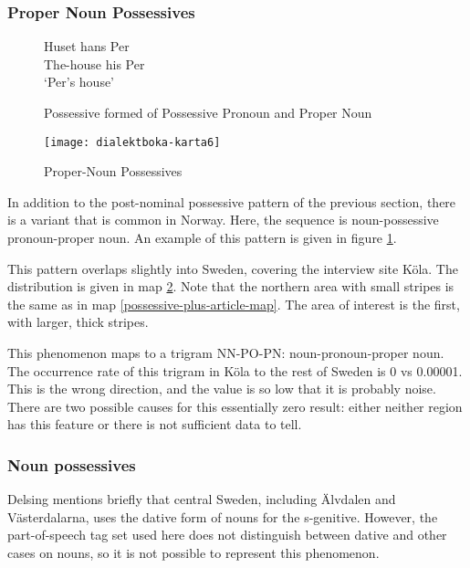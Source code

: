 

\subsubsection{Proper Noun Possessives}

\begin{figure}
 \gll Huset hans Per \\
  The-house his Per \\
  \trans `Per's house'
  \caption{Possessive formed of Possessive Pronoun and Proper Noun}
  \label{proper-noun-post-possessive}
\end{figure}

\begin{figure}
  \texttt{[image: dialektboka-karta6]}
  \caption{Proper-Noun Possessives}
  \label{proper-noun-post-possessive-map}
\end{figure}

In addition to the post-nominal possessive pattern of the previous
section, there is a variant that is common in Norway. Here, the
sequence is noun-possessive pronoun-proper noun. An example
of this pattern is given in figure \ref{proper-noun-post-possessive}.

This pattern overlaps slightly into Sweden, covering the interview
site K\"ola. The distribution is given in map
\ref{proper-noun-post-possessive-map}. Note that the northern area
with small stripes is the same as in map
\ref{possessive-plus-article-map}. The area of interest is the first,
with larger, thick stripes.

This phenomenon maps to a trigram NN-PO-PN: noun-pronoun-proper
noun. The occurrence rate of this trigram in K\"ola to the rest of
Sweden is 0 vs 0.00001. This is the wrong direction, and the value is
so low that it is probably noise. There are two possible causes for
this essentially zero result: either neither region has this feature
or there is not sufficient data to tell.

\subsubsection{Noun possessives}

Delsing mentions briefly that central Sweden, including \"Alvdalen and
V\"asterdalarna, uses the dative form of nouns for the
s-genitive. However, the part-of-speech tag set used here does not
distinguish between dative and other cases on nouns, so it is not
possible to represent this phenomenon.

